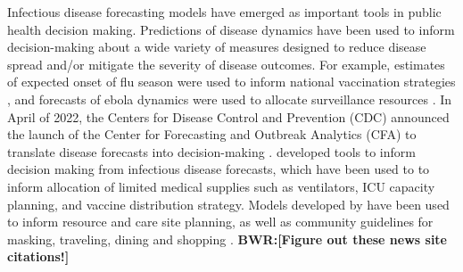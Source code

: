 \documentclass{article}
\def\bwr#1{{\color{violet}\textbf{BWR:[#1]}}}
\begin{document}




Infectious disease forecasting models have emerged as important tools in public health decision making. Predictions of disease dynamics have been used to inform decision-making about a wide variety of measures designed to reduce disease spread and/or mitigate the severity of disease outcomes. For example, estimates of expected onset of flu season were used to inform national vaccination strategies  \citep{igboh2023timing}, and forecasts of ebola dynamics were used to allocate surveillance resources \citep{meltzer2014estimating, rainisch2015regional}. In April of 2022, the Centers for Disease Control and Prevention (CDC) announced the launch of the Center for Forecasting and Outbreak Analytics (CFA) to translate disease forecasts into decision-making \citep{cdc2022cfa}. \cite{bertsimas2021predictionsCOVID} developed tools to inform decision making from infectious disease forecasts, which have been used to to inform allocation of limited medical supplies such as ventilators, ICU capacity planning, and vaccine distribution strategy. Models developed by \cite{fox_real-time_2022} have been used to inform resource and care site planning, as well as community guidelines for masking, traveling, dining and shopping \citep{utnews2022}.  \bwr{Figure out these news site citations!}
\end{document}

